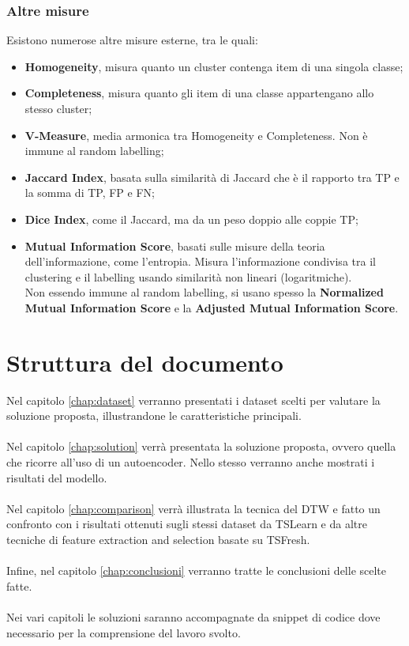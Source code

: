 \subsubsection{Altre misure}
Esistono numerose altre misure esterne, tra le quali:
\begin{itemize}
	\item \textbf{Homogeneity}, misura quanto un cluster contenga item di una singola classe;
	\item \textbf{Completeness}, misura quanto gli item di una classe appartengano allo stesso cluster;
	\item \textbf{V-Measure}, media armonica tra Homogeneity e Completeness. Non è immune al random labelling;
	\item \textbf{Jaccard Index}, basata sulla similarità di Jaccard che è il rapporto tra TP e la somma di TP, FP e FN;
	\item \textbf{Dice Index}, come il Jaccard, ma da un peso doppio alle coppie TP;
	\item \textbf{Mutual Information Score}, basati sulle misure della teoria dell'informazione, come l'entropia. Misura l'informazione condivisa tra il clustering e il labelling usando similarità non lineari (logaritmiche).\\
	Non essendo immune al random labelling, si usano spesso la \textbf{Normalized Mutual Information Score} e la \textbf{Adjusted Mutual Information Score}.
\end{itemize}

\section{Struttura del documento}
Nel capitolo \ref{chap:dataset} verranno presentati i dataset scelti per valutare la soluzione proposta, illustrandone le caratteristiche principali.\\
\\
Nel capitolo \ref{chap:solution} verrà presentata la soluzione proposta, ovvero quella che ricorre all'uso di un autoencoder. Nello stesso verranno anche mostrati i risultati del modello.\\
\\
Nel capitolo \ref{chap:comparison} verrà illustrata la tecnica del DTW e fatto un confronto con i risultati ottenuti sugli stessi dataset da TSLearn e da altre tecniche di feature extraction and selection basate su TSFresh.\\
\\
Infine, nel capitolo \ref{chap:conclusioni} verranno tratte le conclusioni delle scelte fatte.\\
\\
Nei vari capitoli le soluzioni saranno accompagnate da snippet di codice dove necessario per la comprensione del lavoro svolto.